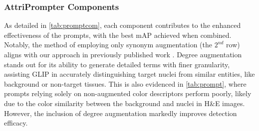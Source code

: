 \documentclass[journal,twoside,web]{ieeecolor}
\begin{document}
\subsubsection{AttriPrompter Components} As detailed in \autoref{tab:promptcom}, each component contributes to the enhanced effectiveness of the prompts, with the best mAP achieved when combined. Notably, the method of employing only synonym augmentation (the $2^{nd}$ row) aligns with our approach in previously published work \cite{wu2023zeroshot}. Degree augmentation stands out for its ability to generate detailed terms with finer granularity, assisting GLIP in accurately distinguishing target nuclei from similar entities, like background or non-target tissues. This is also evidenced in \autoref{tab:prompt}, where prompts relying solely on non-augmented color descriptors perform poorly, likely due to the color similarity between the background and nuclei in H\&E images. However, the inclusion of degree augmentation markedly improves detection efficacy.


\begin{table}[t]
\caption{Results of adopting different pseudo label generation methods for self-training. The results labeled "Ours" did not incorporate knowledge distillation for fair comparison. The best results are marked in \textbf{bold}.}
\label{tab:selftraining}
\begin{center}
\end{center}
\vskip -0.15in
\end{table}
\end{document}
